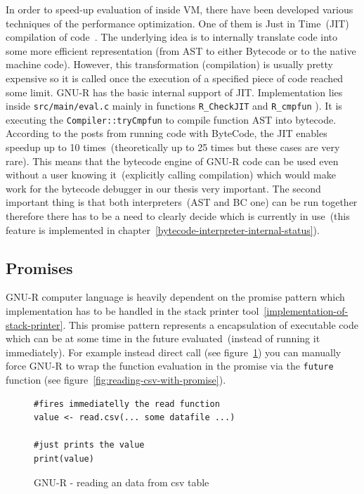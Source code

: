 \documentclass[thesis=M,english]{FITthesis}[2018/10/20]
\newcommand{\code}[1]{\texttt{#1}}
\begin{document}
In order to speed-up evaluation of inside VM, there have been developed various techniques of the performance optimization. One of them is Just in Time~(JIT) compilation of code~\cite{r-jit-speedup}. The underlying idea is to internally translate code into some more efficient representation (from AST to either Bytecode or to the native machine code). However, this transformation (compilation) is usually pretty expensive so it is called once the execution of a specified piece of code reached some limit.
GNU-R has the basic internal support of JIT. Implementation lies inside \code{src/main/eval.c} mainly in functions \code{R{\_}CheckJIT} and \code{R{\_}cmpfun} ). It is executing the \code{Compiler::tryCmpfun} to compile function AST into bytecode. According to the posts from running code with ByteCode, the JIT enables speedup up to 10 times~(theoretically up to 25 times but these cases are very rare).
This means that the bytecode engine of GNU-R code can be used even without a user knowing it~(explicitly calling compilation) which would make work for the bytecode debugger in our thesis very important. The second important thing is that both interpreters~(AST and BC one) can be run together therefore there has to be a need to clearly decide which is currently in use~(this feature is implemented in chapter~\ref{bytecode-interpreter-internal-status}).

\subsection{Promises}\label{computer-promises}

GNU-R computer language is heavily dependent on the promise pattern which implementation has to be handled in the stack printer tool~\ref{implementation-of-stack-printer}. This promise pattern represents a encapsulation of executable code which can be at some time in the future evaluated~(instead of running it immediately). For example instead direct call (see figure~\ref{fig:reading-csv-without-promise}) you can manually force GNU-R to wrap the function evaluation in the promise via the \code{future} function (see figure~\ref{fig:reading-csv-with-promise}).

\begin{figure}[H]
\begin{lstlisting}
#fires immediatelly the read function
value <- read.csv(... some datafile ...)

#just prints the value
print(value)
\end{lstlisting}
\caption{\label{fig:reading-csv-without-promise} GNU-R - reading an data from csv table}
\end{figure}
\end{document}
